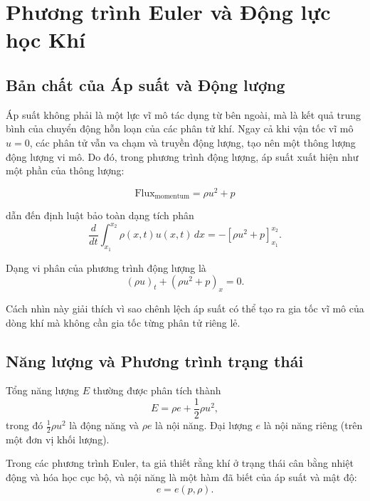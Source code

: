 \section{Phương trình Euler và Động lực học Khí}
\subsection{Bản chất của Áp suất và Động lượng}

Áp suất không phải là một lực vĩ mô tác dụng từ bên ngoài, mà là kết quả trung bình của chuyển động hỗn loạn của các phân tử khí. Ngay cả khi vận tốc vĩ mô $u = 0$, các phân tử vẫn va chạm và truyền động lượng, tạo nên một thông lượng động lượng vi mô. Do đó, trong phương trình động lượng, áp suất xuất hiện như một phần của thông lượng:

\begin{equation*}
    \text{Flux}_{\text{momentum}} = \rho u^2 + p
\end{equation*}

dẫn đến định luật bảo toàn dạng tích phân
\begin{equation*}
\frac{d}{dt} \int_{x_1}^{x_2} \rho(x,t)u(x,t)\,dx
= -[\rho u^2 + p]_{x_1}^{x_2}.
\tag{14.3}
\end{equation*}

Dạng vi phân của phương trình động lượng là
\begin{equation*}
(\rho u)_t + (\rho u^2 + p)_x = 0.
\tag{14.4}
\end{equation*}

Cách nhìn này giải thích vì sao chênh lệch áp suất có thể tạo ra gia tốc vĩ mô của dòng khí mà không cần gia tốc từng phân tử riêng lẻ.

\subsection{Năng lượng và Phương trình trạng thái}

Tổng năng lượng $E$ thường được phân tích thành
\begin{equation*}
E = \rho e + \frac12 \rho u^2,
\tag{14.5}
\end{equation*}
trong đó $\frac12\rho u^2$ là động năng và $\rho e$ là nội năng. Đại lượng $e$ là nội năng riêng (trên một đơn vị khối lượng).

Trong các phương trình Euler, ta giả thiết rằng khí ở trạng thái cân bằng nhiệt động và hóa học cục bộ, và nội năng là một hàm đã biết của áp suất và mật độ:
\begin{equation*}
e = e(p,\rho).
\tag{14.6}
\end{equation*}


